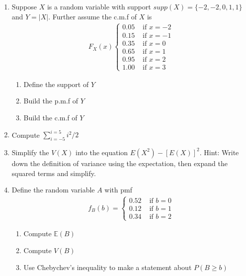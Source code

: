 \begin{enumerate}
    \item Suppose $X$ is a random variable with support $supp(X) = \{-2,-2,0,1,1\}$ and $Y = |X|$. Further assume the c.m.f of $X$ is 
    \begin{align}
        F_{X}(x) \begin{cases}
                     0.05 & \text{ if } x=-2\\
                     0.15 & \text{ if } x=-1\\
                     0.35 & \text{ if } x=0\\
                     0.65 & \text{ if } x=1\\
                     0.95 & \text{ if } x=2\\
                     1.00 & \text{ if } x=3
                  \end{cases}
    \end{align}
    \begin{enumerate}
            \item Define the support of $Y$
        \item Build the p.m.f of $Y$
        \item Build the c.m.f of $Y$
    \end{enumerate}
    
    \item Compute $\sum_{i=-5}^{i=5} i^{2}/2$
    
    \item Simplify the $V(X)$ into the equation $E(X^{2}) - \left[E(X)\right]^{2}$. Hint: Write down the definition of variance using the expectation, then expand the squared terms and simplify.
    
    \item Define the random variable $A$ with pmf
    \begin{align}
        f_{B}(b) = \begin{cases}
                      0.52 &\text{ if } b=0\\
                      0.12 &\text{ if } b=1\\
                      0.34 &\text{ if } b=2
                   \end{cases}
    \end{align} 
    \begin{enumerate}
        \item Compute $\mathbb{E}(B)$
        \item Compute $V(B)$
        \item Use Chebychev's inequality to make a statement about $P(B \geq b)$ 
    \end{enumerate}
    

    
\end{enumerate}

